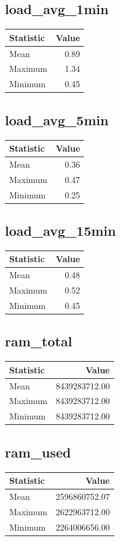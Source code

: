 \documentclass[11pt]{article}
\begin{document}
\subsection{load_avg_1min}
\begin{tabular}{lr}
\toprule
Statistic & Value \\
\midrule
Mean & 0.89 \\
Maximum & 1.34 \\
Minimum & 0.45 \\
\bottomrule
\end{tabular}


\subsection{load_avg_5min}
\begin{tabular}{lr}
\toprule
Statistic & Value \\
\midrule
Mean & 0.36 \\
Maximum & 0.47 \\
Minimum & 0.25 \\
\bottomrule
\end{tabular}


\subsection{load_avg_15min}
\begin{tabular}{lr}
\toprule
Statistic & Value \\
\midrule
Mean & 0.48 \\
Maximum & 0.52 \\
Minimum & 0.45 \\
\bottomrule
\end{tabular}


\subsection{ram_total}
\begin{tabular}{lr}
\toprule
Statistic & Value \\
\midrule
Mean & 8439283712.00 \\
Maximum & 8439283712.00 \\
Minimum & 8439283712.00 \\
\bottomrule
\end{tabular}


\subsection{ram_used}
\begin{tabular}{lr}
\toprule
Statistic & Value \\
\midrule
Mean & 2596860752.07 \\
Maximum & 2622963712.00 \\
Minimum & 2264006656.00 \\
\bottomrule
\end{tabular}
\end{document}
